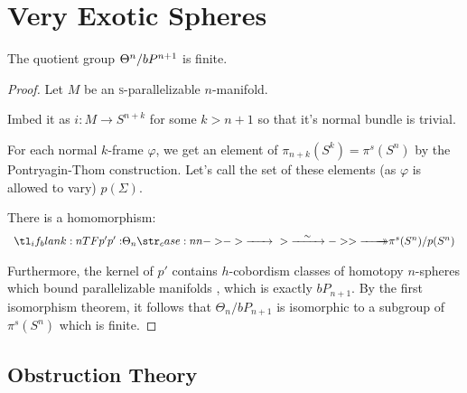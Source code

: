 \section{Very Exotic Spheres}

\begin{theorem}\label{thm:finite-very-exotic-spheres}
	The quotient group $\Theta^n / bP^{n+1}$ is finite.
\end{theorem}
\begin{proof}
	Let $M$ be an \textsc{s}-parallelizable $n$-manifold. 

	Imbed it as $i : M \to S^{n+k}$ for some $k>n+1$ so that it's normal bundle is trivial.

	For each normal $k$-frame $\varphi$, we get an element of $\pi_{n+k}(S^k) = \pi^s(S^n)$ by the Pontryagin-Thom construction. Let's call the set of these elements (as $\varphi$ is allowed to vary) $p(\Sigma)$. 


	\begin{lemma}
		There is a homomorphism:
		\[
			\lkxfunc{p'}{\Theta_n}{\pi^s(S^n)/p(S^n)}
		\]
	\end{lemma}

	Furthermore, the kernel of $p'$ contains $h$-cobordism classes of homotopy $n$-spheres which bound parallelizable manifolds , which is exactly $bP_{n+1}$. By the first isomorphism theorem, it follows that $\Theta_n/bP_{n+1}$ is isomorphic to a subgroup of $\pi^s(S^n)$ which is finite.
\end{proof}

\subsection{Obstruction Theory}\label{sec:obstruction-theory}


